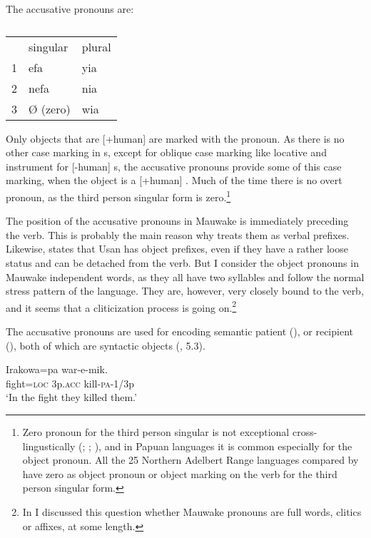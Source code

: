 The accusative pronouns are:

\begin{table}
\caption{}
\label{} 
\begin{tabular}{lll}
 &singular &plural\\
1 &efa &yia\\
2 &nefa &nia\\
3 &{\O} (zero) &wia\\
\end{tabular}
\end{table}


Only objects that are [+human] are marked with the pronoun. As there is no other case marking in s, except for oblique case marking like locative and instrument for [\nobreakdash-human] s, the accusative pronouns provide some of this case marking, when the object is a [+human] . Much of the time there is no overt pronoun, as the third person singular form is zero.\footnote{Zero pronoun for the third person singular is not exceptional cross-lingustically (\citealt[278]{Lyons1968}; \citealt[66]{Foley1986}; \citealt[166]{Givon1976}), and in Papuan languages it is common especially for the object pronoun. All the 25 Northern Adelbert Range languages compared by \citet[9,160]{ZGraggen1980} have zero as object pronoun or object marking on the verb for the third person singular form.} 

The position of the accusative pronouns in Mauwake is immediately preceding the verb. This is probably the main reason why \citet{ZGraggen1971} treats them as verbal prefixes. Likewise, \citet[108]{Reesink1987} states that Usan has object prefixes, even if they have a rather loose status and can be detached from the verb. But I consider the object pronouns in Mauwake independent words, as they all have two syllables and follow the normal stress pattern of the language. They are, however, very closely bound to the verb, and it seems that a cliticization process is going on.\footnote{In \citet{Jarvinen1991} I discussed this question whether Mauwake pronouns are full words, clitics or affixes, at some length.} 

The accusative pronouns are used for encoding semantic patient (), or recipient (), both of which are syntactic objects (, 5.3). 

\ea%
\label{ex:x548}
\gll Irakowa=pa  war-e-mik. \\
fight=\textsc{loc} 3p.\textsc{acc} kill-\textsc{pa}-1/3p\\
\glt`In the fight they killed them.'
\z

